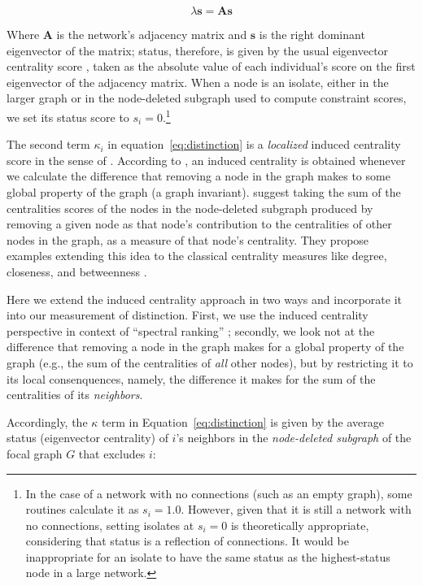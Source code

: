\documentclass[12pt]{article}
\begin{document}
\begin{equation}
\lambda\mathbf{s}= \mathbf{A}\mathbf{s}
\label{eq:eigen}
\end{equation}

Where $\mathbf{A}$ is the network's adjacency matrix and $\mathbf{s}$ is the right dominant eigenvector of the matrix; status, therefore, is given by the usual eigenvector centrality score \citep{bonacich1972factoring-03e}, taken as the absolute value of each individual's score on the first eigenvector of the adjacency matrix. When a node is an isolate, either in the larger graph or in the node-deleted subgraph used to compute constraint scores, we set its status score to $s_i =0$.\footnote{In the case of a network with no connections (such as an empty graph), some routines calculate it as $s_i =1.0$. However, given that it is still a network with no connections, setting isolates at $s_i =0$ is theoretically appropriate, considering that status is a reflection of connections. It would be inappropriate for an isolate to have the same status as the highest-status node in a large network.}

The second term $\kappa_i$ in equation~\ref{eq:distinction} is a \textit{localized} induced centrality score in the sense of \citet{borgatti2020oxford-fa6}. According to \citet{everett2010induced-817}, an induced centrality is obtained whenever we calculate the difference that removing a node in the graph makes to some global property of the graph (a graph invariant). \citet{everett2010induced-817} suggest taking the sum of the centralities scores of the nodes in the node-deleted subgraph produced by removing a given node as that node's contribution to the centralities of other nodes in the graph, as a measure of that node's centrality. They propose examples extending this idea to the classical centrality measures like degree, closeness, and betweenness \citep{freeman79}. 

Here we extend the induced centrality approach in two ways and incorporate it into our measurement of distinction. First, we use the induced centrality perspective in context of ``spectral ranking'' \citep{boldi_vigna14}; secondly, we look not at the difference that removing a node in the graph makes for a global property of the graph (e.g., the sum of the centralities of \textit{all} other nodes), but by restricting it to its local consenquences, namely, the difference it makes for the sum of the centralities of its \textit{neighbors}.  

Accordingly, the $\kappa$ term in Equation~\ref{eq:distinction} is given by the average status (eigenvector centrality) of $i$'s neighbors in the \textit{node-deleted subgraph} of the focal graph $G$ that excludes $i$:
\end{document}

